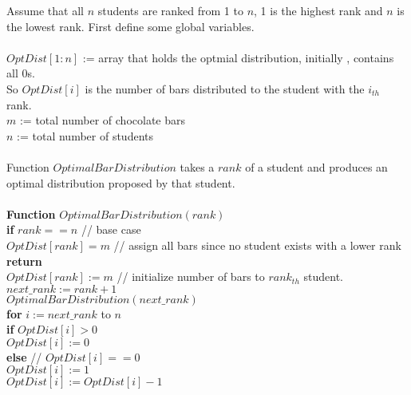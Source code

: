 \documentclass[11pt]{article}
\begin{document}
Assume that all $n$ students are ranked from 1 to $n$, 1 is the
highest rank and $n$ is the lowest rank. First define some global variables.\\\\ 
$OptDist[1:n]$ := array that holds the optmial distribution, initially
, contains all 0s.\\
So $OptDist[i]$ is the number of bars distributed to the student with
the $i_{th}$ rank.\\
$m$ := total number of chocolate bars\\
$n$ := total number of students\\\\
Function $OptimalBarDistribution$ takes a $rank$ of a student
and produces an optimal distribution proposed by that student.\\\\
\textbf{Function} $OptimalBarDistribution( rank )$\\
\-\hspace{2em} \textbf{if} $rank == n$ // base case \\
\-\hspace{4em} $OptDist[rank] = m$ // assign all bars since no student
exists with a lower rank \\
\-\hspace{4em} \textbf{return}\\
\-\hspace{2em} $OptDist[rank] := m$ // initialize number of bars to
$rank_{th}$ student.\\
\-\hspace{2em} $next\_rank := rank+1$\\
\-\hspace{2em} $OptimalBarDistribution( next\_rank )$\\
\-\hspace{2em} \textbf{for} $i := next\_rank$ to $n$\\
\-\hspace{4em} \textbf{if} $OptDist[i] > 0$\\
\-\hspace{6em} $OptDist[i] := 0$\\
\-\hspace{4em} \textbf{else} // $OptDist[i] == 0$\\
\-\hspace{6em} $OptDist[i] := 1$\\
\-\hspace{6em} $OptDist[i] := OptDist[i] - 1$\\
\end{document}
